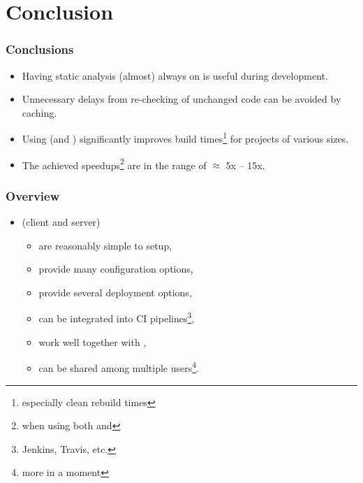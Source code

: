\documentclass[compress,table,xcolor=table]{beamer}
\begin{document}
\section{Conclusion}
\begin{frame}
  \Huge
\end{frame}
\begin{frame}
  \frametitle{Conclusions}
    \Large
    \begin{itemize}
    \item Having static analysis (almost) always on is useful during development.
    \item Unnecessary delays from re-checking of unchanged code can be avoided
        by caching.
    \item Using  (and )
        significantly improves build times\footnote{especially clean rebuild
            times} for projects of various sizes.
    \item The achieved speedups\footnote{when using both 
        and } are in the range of $\approx$ 5x -- 15x.
    \end{itemize}
\end{frame}
\begin{frame}
  \frametitle{Overview}
    \LARGE
    \begin{itemize}
    \item {} (client and server)
    \begin{itemize}
    \item are reasonably simple to setup,
    \item provide many configuration options,
    \item provide several deployment options,
    \item can be integrated into CI pipelines\footnote{Jenkins, Travis, etc.},
    \item work well together with ,
	\item can be shared among multiple users\footnote{more in a moment}.
    \end{itemize}
    \end{itemize}
\end{frame}
\end{document}

